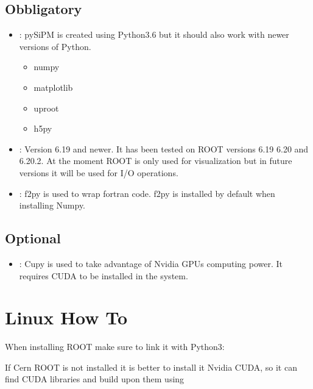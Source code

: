 \documentclass[letterpaper,10pt,english]{sphinxmanual}
\begin{document}
\subsection{Obbligatory}
\label{\detokenize{installation:obbligatory}}\begin{itemize}
\item {} 
: pySiPM is created using Python3.6 but it should also work with newer versions of Python.
\begin{itemize}
\item {} 
numpy

\item {} 
matplotlib

\item {} 
uproot

\item {} 
h5py

\end{itemize}

\item {} 
: Version 6.19 and newer. It has been tested on ROOT versions 6.19 \sphinxhyphen{} 6.20 and 6.20.2. At the moment ROOT is only used for visualization but in future versions it will be used for I/O operations. 

\item {} 
: f2py is used to wrap fortran code. f2py is installed by default when installing Numpy.

\end{itemize}


\subsection{Optional}
\label{\detokenize{installation:optional}}\begin{itemize}
\item {} 
: Cupy is used to take advantage of Nvidia GPUs computing power. It requires CUDA to be installed in the system. 

\end{itemize}


\section{Linux How To}
\label{\detokenize{installation:linux-how-to}}
\begin{DUlineblock}{0em}
\item[] When installing ROOT make sure to link it with Python3: 
\item[] If Cern ROOT is not installed it is better to install it  Nvidia CUDA, so it can find CUDA libraries and build upon them using 
\end{DUlineblock}
\end{document}
